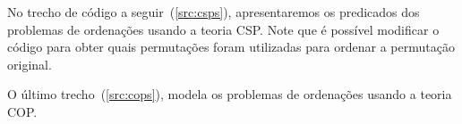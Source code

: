 \vspace{1.0cm}



No trecho de código a seguir~(\ref{src:csps}), apresentaremos os
predicados dos problemas de ordenações usando a teoria CSP. Note que é
possível modificar o código para obter quais permutações foram utilizadas
para ordenar a permutação original.

\vspace{1.0cm}



O último trecho~(\ref{src:cops}), modela os problemas de ordenações
usando a teoria COP. 

\vspace{1.0cm}



